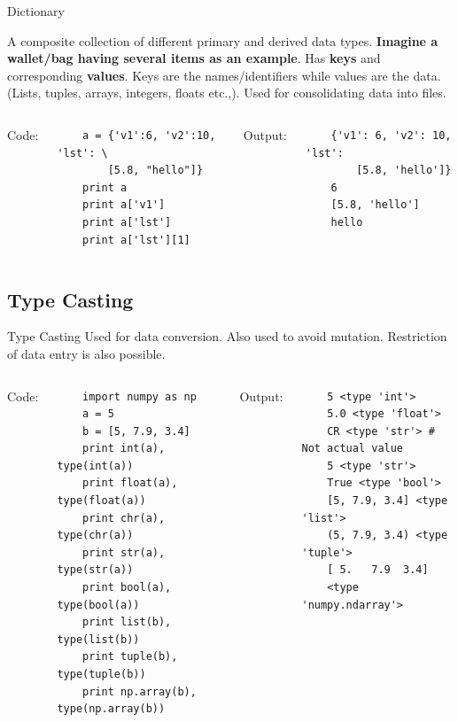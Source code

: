 \documentclass[10pt]{beamer}
\begin{document}
\begin{frame}[fragile]{Dictionary}

A composite collection of different primary and derived data types. \textbf{Imagine a wallet/bag having several items as an example}. Has \textbf{keys} and corresponding \textbf{values}. Keys are the names/identifiers while values are the data. (Lists, tuples, arrays, integers, floats etc.,). Used for consolidating data into files.
\begin{columns}[t]
	Code:
\begin{lstlisting}
	a = {'v1':6, 'v2':10, 'lst': \
	    [5.8, "hello"]}
	print a
	print a['v1']
	print a['lst']
	print a['lst'][1]
\end{lstlisting}
	Output:
\begin{lstlisting}
	{'v1': 6, 'v2': 10, 'lst':
	    [5.8, 'hello']}
	6
	[5.8, 'hello']
	hello
\end{lstlisting}	
	\end{columns}
\end{frame}
\subsection{Type Casting}
\begin{frame}[fragile]{Type Casting}
Used for data conversion. Also used to avoid mutation. Restriction of data entry is also possible.

\begin{columns}[t]
	Code:
\begin{lstlisting}
	import numpy as np
	a = 5
	b = [5, 7.9, 3.4]
	print int(a), type(int(a))           
	print float(a), type(float(a))       
	print chr(a), type(chr(a))          
	print str(a), type(str(a))          
	print bool(a), type(bool(a))        
	print list(b), type(list(b))         
	print tuple(b), type(tuple(b))       
	print np.array(b), type(np.array(b))
\end{lstlisting}
	Output:
\begin{lstlisting}
	5 <type 'int'>
	5.0 <type 'float'>
	CR <type 'str'> # Not actual value
	5 <type 'str'>
	True <type 'bool'>
	[5, 7.9, 3.4] <type 'list'>
	(5, 7.9, 3.4) <type 'tuple'>
	[ 5.   7.9  3.4] 
	<type 'numpy.ndarray'>
\end{lstlisting}
\end{columns}
\end{frame}
\end{document}
